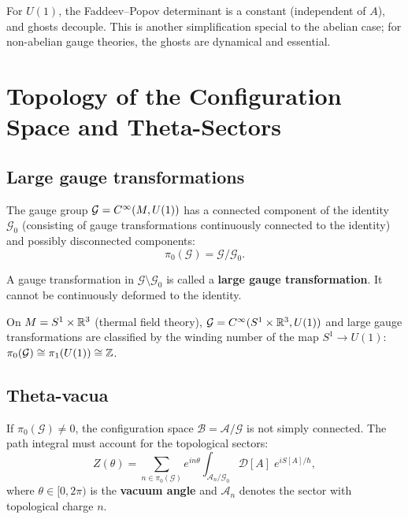 For $U(1)$, the Faddeev--Popov determinant is a constant (independent of $A$), and ghosts decouple. This is another simplification special to the abelian case; for non-abelian gauge theories, the ghosts are dynamical and essential.

\section{Topology of the Configuration Space and Theta-Sectors}

\subsection{Large gauge transformations}

The gauge group $\mathcal{G} = C^{\infty}(M, U(1))$ has a connected component of the identity $\mathcal{G}_0$ (consisting of gauge transformations continuously connected to the identity) and possibly disconnected components:
\begin{equation}
\pi_0(\mathcal{G}) = \mathcal{G}/\mathcal{G}_0.
\end{equation}

A gauge transformation in $\mathcal{G} \setminus \mathcal{G}_0$ is called a \textbf{large gauge transformation}. It cannot be continuously deformed to the identity.

\begin{example}
On $M = S^1 \times \mathbb{R}^3$ (thermal field theory), $\mathcal{G} = C^{\infty}(S^1 \times \mathbb{R}^3, U(1))$ and large gauge transformations are classified by the winding number of the map $S^1 \to U(1)$: $\pi_0(\mathcal{G}) \cong \pi_1(U(1)) \cong \mathbb{Z}$.
\end{example}

\subsection{Theta-vacua}

If $\pi_0(\mathcal{G}) \neq 0$, the configuration space $\mathcal{B} = \mathcal{A}/\mathcal{G}$ is not simply connected. The path integral must account for the topological sectors:
\begin{equation}
Z(\theta) = \sum_{n \in \pi_0(\mathcal{G})} e^{in\theta} \int_{\mathcal{A}_n/\mathcal{G}_0} \mathcal{D}[A]\;e^{iS[A]/\hbar},
\end{equation}
where $\theta \in [0, 2\pi)$ is the \textbf{vacuum angle} and $\mathcal{A}_n$ denotes the sector with topological charge $n$.

